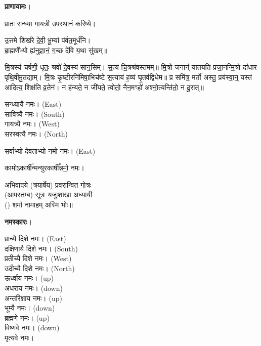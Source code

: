 \textbf{प्राणायामः।}


प्रातः सन्ध्या गायत्री उपस्थानं करिष्ये।

उ॒त्तमे शिख॑रे दे॒वी॒ भू॒म्यां प॑र्वत॒मूर्ध॑नि।\\
ब्रा॒ह्मणे॑॑भ्यो ह्य॑नुज्ञा॒नं॒ ग॒च्छ दे॑वि य॒था सु॑खम्॥


मि॒त्रस्य॑ चर्\mbox{}षणी॒ धृतः॒ श्रवो॑ दे॒वस्य॑ सान॒सिम्। स॒त्यं चि॒त्रश्र॑वस्तमम्॥ मि॒त्रो जनान्॑ यातयति प्रजा॒नन्मि॒त्रो दा॑धार पृथि॒वीमु॒तद्याम्। मि॒त्रः कृ॒ष्टीरनि॑मिषा॒भिच॑ष्टे स॒त्याय॑ ह॒व्यं घृ॒तव॑द्विधेम॥ प्र समि॑त्र॒ मर्तो॑ अस्तु॒ प्रय॑स्वा॒न्॒ यस्त॑ आदित्य॒ शिक्ष॑ति व्र॒तेन॑। न ह॑न्यते॒ न जी॑यते॒ त्वोतो॒ नैन॒मꣳहो॑ अश्नो॒त्यन्ति॑तो॒ न दू॒रात्॥



सन्ध्यायै नमः।  {\scriptsize (East)}\\
सावित्र्यै नमः। {\scriptsize (South)}\\
गायत्र्यै नमः।  {\scriptsize (West)}\\
सरस्वत्यै नमः।  {\scriptsize (North)}

सर्वाभ्यो देवताभ्यो नमो नमः। {\scriptsize (East)}

कामोऽकार्\mbox{}षी᳚न्मन्युरकार्\mbox{}षी᳚न्नमो॒ नमः।

अभिवादये \blank{} (त्रयार्षेय) प्रवरान्वित \blank{} गोत्रः\\
(आपस्तम्ब) सूत्रः यजुःशाखा अध्यायी\\
() शर्मा नामाहम् अस्मि भोः॥

\textbf{नमस्कारः।}


प्राच्यै दिशे नमः।   {\scriptsize (East)}\\
दक्षिणायै दिशे नमः।  {\scriptsize (South)}\\
प्रतीच्यै दिशे नमः।   {\scriptsize (West)}\\
उदीच्यै दिशे नमः।   {\scriptsize (North)}\\
ऊर्ध्वाय नमः।   {\scriptsize (up)}\\
अधराय नमः।   {\scriptsize (down)}\\
अन्तरिक्षाय नमः। {\scriptsize (up)}\\
भूम्यै नमः। {\scriptsize (down)}\\
ब्रह्मणे नमः। {\scriptsize (up)}\\
विष्णवे नमः।  {\scriptsize (down)}\\
मृत्यवे नमः।

